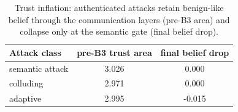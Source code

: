 \begin{table}[t]
\centering
\caption{Trust inflation: authenticated attacks retain benign-like belief through the communication layers (pre-B3 area) and collapse only at the semantic gate (final belief drop).}
\label{tab:inflation}
\begin{tabular}{lcc}
\toprule
Attack class & pre-B3 trust area & final belief drop \\
\midrule
semantic attack & 3.026 & 0.000 \\
colluding & 2.971 & 0.000 \\
adaptive & 2.995 & -0.015 \\
\bottomrule
\end{tabular}
\end{table}
